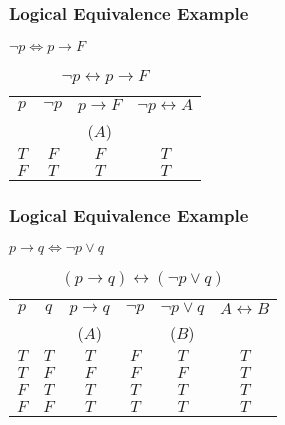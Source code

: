 \documentclass[dvipsnames]{beamer}
\begin{document}
\begin{frame}
  \frametitle{Logical Equivalence Example}

  $\neg p \Leftrightarrow p \rightarrow F$

  \begin{table}
    \caption{$\neg p \leftrightarrow p \rightarrow F$}
    \begin{tabular}{|c|c|c||c|}\hline
      $p$ & $\neg p$ & $p \rightarrow F$ & $\neg p \leftrightarrow A$\\
          &          & ($A$)             &\\\hline\hline
      $T$ & $F$ & $F$ & $T$\\\hline
      $F$ & $T$ & $T$ & $T$\\\hline
    \end{tabular}
  \end{table}
\end{frame}

\begin{frame}
  \frametitle{Logical Equivalence Example}

  $p \rightarrow q \Leftrightarrow \neg p \vee q$

  \begin{table}
    \caption{$(p \rightarrow q) \leftrightarrow (\neg p \vee q)$}
    \begin{tabular}{|c|c|c|c|c||c|}\hline
      $p$ & $q$ & $p \rightarrow q$ & $\neg p$ & $\neg p \vee q$ & $A \leftrightarrow B$\\
          &     & ($A$)             &          & ($B$)           &\\\hline\hline
      $T$ & $T$ & $T$ & $F$ & $T$ & $T$\\\hline
      $T$ & $F$ & $F$ & $F$ & $F$ & $T$\\\hline
      $F$ & $T$ & $T$ & $T$ & $T$ & $T$\\\hline
      $F$ & $F$ & $T$ & $T$ & $T$ & $T$\\\hline
    \end{tabular}
  \end{table}
\end{frame}
\end{document}
